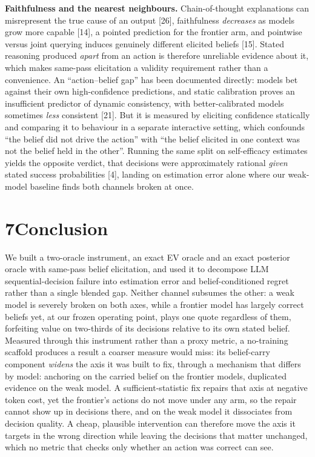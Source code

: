 \documentclass[
  10pt,
]{article}
\begin{document}
\textbf{Faithfulness and the nearest neighbours.} Chain-of-thought explanations can misrepresent the true cause of an output {[}26{]}, faithfulness \emph{decreases} as models grow more capable {[}14{]}, a pointed prediction for the frontier arm, and pointwise versus joint querying induces genuinely different elicited beliefs {[}15{]}. Stated reasoning produced \emph{apart} from an action is therefore unreliable evidence about it, which makes same-pass elicitation a validity requirement rather than a convenience. An ``action--belief gap'' has been documented directly: models bet against their own high-confidence predictions, and static calibration proves an insufficient predictor of dynamic consistency, with better-calibrated models sometimes \emph{less} consistent {[}21{]}. But it is measured by eliciting confidence statically and comparing it to behaviour in a separate interactive setting, which confounds ``the belief did not drive the action'' with ``the belief elicited in one context was not the belief held in the other''. Running the same split on self-efficacy estimates yields the opposite verdict, that decisions were approximately rational \emph{given} stated success probabilities {[}4{]}, landing on estimation error alone where our weak-model baseline finds both channels broken at once.

\section{7\quad Conclusion}\label{conclusion}

We built a two-oracle instrument, an exact EV oracle and an exact posterior oracle with same-pass belief elicitation, and used it to decompose LLM sequential-decision failure into estimation error and belief-conditioned regret rather than a single blended gap. Neither channel subsumes the other: a weak model is severely broken on both axes, while a frontier model has largely correct beliefs yet, at our frozen operating point, plays one quote regardless of them, forfeiting value on two-thirds of its decisions relative to its own stated belief. Measured through this instrument rather than a proxy metric, a no-training scaffold produces a result a coarser measure would miss: its belief-carry component \emph{widens} the axis it was built to fix, through a mechanism that differs by model: anchoring on the carried belief on the frontier models, duplicated evidence on the weak model. A sufficient-statistic fix repairs that axis at negative token cost, yet the frontier's actions do not move under any arm, so the repair cannot show up in decisions there, and on the weak model it dissociates from decision quality. A cheap, plausible intervention can therefore move the axis it targets in the wrong direction while leaving the decisions that matter unchanged, which no metric that checks only whether an action was correct can see.
\end{document}
